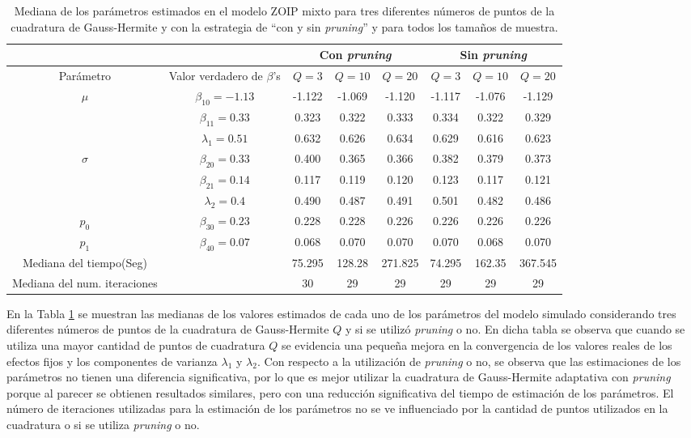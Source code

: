 \begin{table}[!hbt]
{\scriptsize
\begin{center}
\begin{tabular}{|c|c|c|c|c|c|c|c|}\hline
& & \multicolumn{3}{|c|}{Con \textit{pruning}} & \multicolumn{3}{|c|}{Sin \textit{pruning}} \\ \hline
Par\'{a}metro & Valor verdadero de $\beta$'s & $Q=3$ & $Q=10$ & $Q=20$ & $Q=3$ & $Q=10$ & $Q=20$ \\ \hline \hline
\multirow{3}{*}{$\mu$} & $\beta_{10}=-1.13$ & -1.122	& -1.069	& -1.120	& -1.117	& -1.076	& -1.129 \\ 
& $\beta_{11}=0.33$& 0.323	&0.322	&0.333	&0.334	&0.322	&0.329 \\
& $\lambda_1=0.51$ & 0.632	&0.626	&0.634	&0.629	&0.616	&0.623 \\ \hline
\multirow{3}{*}{$\sigma$} & $\beta_{20}=0.33$ & 0.400	&0.365	&0.366	&0.382	&0.379	&0.373 \\ 
& $\beta_{21}=0.14$ & 0.117	&0.119	&0.120	&0.123	&0.117	&0.121 \\
& $\lambda_2=0.4$& 0.490	&0.487	&0.491	&0.501	&0.482	&0.486 \\ \hline
$p_0$& $\beta_{30}=0.23$ &0.228	&0.228	&0.226	&0.226	&0.226	&0.226 \\ \hline
$p_1$& $\beta_{40}=0.07$ &0.068	&0.070	&0.070	&0.070	&0.068	&0.070 \\ \hline
Mediana del tiempo(Seg)& &75.295	&128.28	&271.825	&74.295	&162.35	&367.545 \\ \hline
Mediana del num. iteraciones& &30	&29	&29	&29	&29	&29 \\ \hline
\end{tabular}
\caption{Mediana de los par\'{a}metros estimados en el modelo ZOIP mixto para tres diferentes n\'{u}meros de puntos de la cuadratura de Gauss-Hermite y con la estrategia de ``con y sin \textit{pruning}'' y para todos los tama\~{n}os de muestra.}
\label{T_Sim_mix_ncua}
\end{center}
}
\end{table}

En la Tabla \ref{T_Sim_mix_ncua} se muestran las medianas de los valores estimados de cada uno de los par\'{a}metros del modelo simulado considerando tres diferentes n\'{u}meros de puntos de la cuadratura de Gauss-Hermite $Q$ y si se utiliz\'{o} \textit{pruning} o no. En dicha tabla se observa que cuando se utiliza una mayor cantidad de puntos de cuadratura $Q$ se evidencia una peque\~{n}a mejora en la convergencia de los valores reales de los efectos fijos y los componentes de varianza $\lambda_1$ y $\lambda_2$. Con respecto a la utilizaci\'{o}n de \textit{pruning} o no, se observa que las estimaciones de los par\'{a}metros no tienen una diferencia significativa, por lo que es mejor utilizar la cuadratura de Gauss-Hermite adaptativa con \textit{pruning} porque al parecer se obtienen resultados similares, pero con una reducci\'{o}n significativa del tiempo de estimaci\'{o}n de los par\'{a}metros. El n\'{u}mero de iteraciones utilizadas para la estimaci\'{o}n de los par\'{a}metros no se ve influenciado por la cantidad de puntos utilizados en la cuadratura o si se utiliza \textit{pruning} o no.\\

